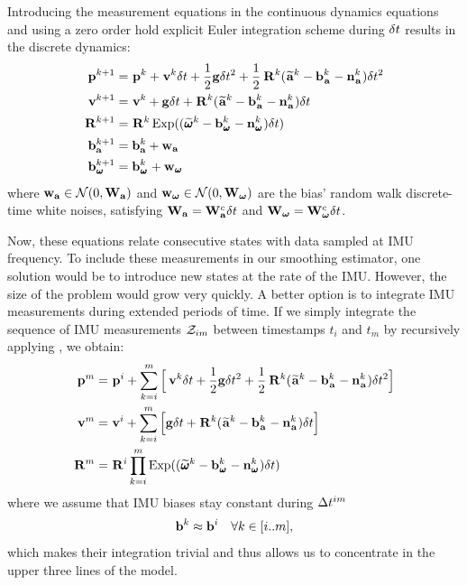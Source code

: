 Introducing the measurement equations  in the continuous dynamics equations  and using a zero order hold
explicit Euler integration scheme during $\delta t$ results in the discrete dynamics:
%
\begin{equation}
    \begin{split}
    \prescript{}{}{{\bf p}}_{}^{k+1} &= \prescript{}{}{{\bf p}}_{}^{k} + \prescript{}{}{{\bf v}}_{}^{k}\delta t + \frac{1}{2}{\bf g} \delta t^2 
    + \frac{1}{2}\prescript{}{}{{\bf R}}_{}^{k}(\prescript{}{}{\widetilde{{\bf a}}}_{}^k - {\bf b}_{\prescript{}{}{{\bf a}}_{}}^k - {\bf n}_{\prescript{}{}{{\bf a}}_{}}^k)\delta t^2 \\
    \prescript{}{}{{\bf v}}_{}^{k+1}  &= \prescript{}{}{{\bf v}}_{}^{k} + {\bf g} \delta t + \prescript{}{}{{\bf R}}_{}^{k}(\prescript{}{}{\widetilde{{\bf a}}}_{}^k - {\bf b}_{\prescript{}{}{{\bf a}}_{}}^k - {\bf n}_{\prescript{}{}{{\bf a}}_{}}^k)\delta t
    \\
    \prescript{}{}{{\bf R}}_{}^{k+1}  &= \prescript{}{}{{\bf R}}_{}^{k}\operatorname*{Exp}((\prescript{}{}{\widetilde{\pmb{\omega}}}_{}^k - {\bf b}_{\prescript{}{}{\pmb{\omega}}_{}}^k - {\bf n}_{\prescript{}{}{\pmb{\omega}}_{}}^k)\delta t)
    \\
    {\bf b}_{\bf a}^{k+1} &= {\bf b}_{\bf a}^k + {\bf w}_{\bf a}\\
    {\bf b}_{\prescript{}{}{\pmb{\omega}}_{}}^{k+1} &= {\bf b}_{\prescript{}{}{\pmb{\omega}}_{}}^k + {\bf w}_{\prescript{}{}{\pmb{\omega}}_{}}
    \end{split}
    \label{eq:imu_dyn_disc}
\end{equation}
%
where ${\bf w}_{{\bf a}} \in \mathcal{N}(0,{\bf W}_{\bf a})$ and ${\bf w}_{{{\bm \omega}}} \in \mathcal{N}(0,{\bf W}_{{\bm \omega}})$ are the bias' random walk discrete-time white noises, satisfying ${\bf W}_{\bf a}={\bf W}_{\bf a}^c \delta t$ and ${\bf W}_{{\bm \omega}}={\bf W}_{{\bm \omega}}^c\delta t$.

    
Now, these equations relate consecutive states with data sampled at IMU frequency. To include these measurements in our smoothing estimator,
one solution would be to introduce new states at the rate of the IMU. However, the size of the problem would grow very quickly. A better option
is to integrate IMU measurements during extended periods of time. If we simply integrate the sequence of IMU measurements $\mathcal{Z}_{im}$ between timestamps 
$t_i$ and $t_m$ by recursively applying , we obtain:
%
\begin{equation}
    \begin{split}
    \prescript{}{}{{\bf p}}_{}^{m} &= \prescript{}{}{{\bf p}}_{}^{i} + \sum_{k=i}^{m} \Big[\prescript{}{}{{\bf v}}_{}^{k}\delta t + \frac{1}{2}{\bf g} \delta t^2 
    + \frac{1}{2}\prescript{}{}{{\bf R}}_{}^{k}(\prescript{}{}{\widetilde{{\bf a}}}_{}^k - {\bf b}_{\prescript{}{}{{\bf a}}_{}}^k - {\bf n}_{\prescript{}{}{{\bf a}}_{}}^k)\delta t^2 \Big] \\
    \prescript{}{}{{\bf v}}_{}^{m}  &= \prescript{}{}{{\bf v}}_{}^{i} + \sum_{k=i}^{m} \Big[{\bf g} \delta t + \prescript{}{}{{\bf R}}_{}^{k}(\prescript{}{}{\widetilde{{\bf a}}}_{}^k - {\bf b}_{\prescript{}{}{{\bf a}}_{}}^k - {\bf n}_{\prescript{}{}{{\bf a}}_{}}^k)\delta t \Big]  \\
    \prescript{}{}{{\bf R}}_{}^{m}  &= \prescript{}{}{{\bf R}}_{}^{i} \prod_{k=i}^{m} \operatorname*{Exp}((\prescript{}{}{\widetilde{\pmb{\omega}}}_{}^k - {\bf b}_{\prescript{}{}{\pmb{\omega}}_{}}^k - {\bf n}_{\prescript{}{}{\pmb{\omega}}_{}}^k)\delta t) 
    \end{split}
    \label{eq:IMUIntij}
\end{equation}
%
where we assume that IMU biases stay constant during $\Delta t^{im}$
\begin{equation*}
    {\bf b}^k \approx {\bf b}^i  ~~~ \forall k \in [i..m],
\end{equation*}
%
which makes their integration trivial and thus allows us to concentrate in the upper three lines of the model.


